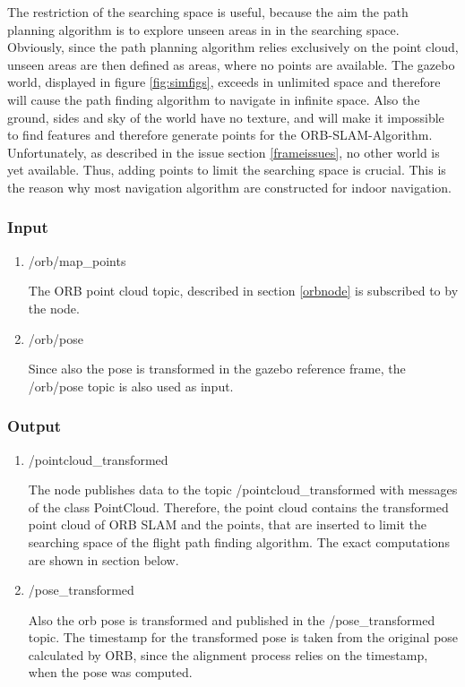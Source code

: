 	The restriction of the searching space is useful, because the aim the path planning algorithm is to explore unseen areas in in the searching space. Obviously, 
	since the path planning algorithm relies exclusively on the point cloud, unseen areas are then defined as areas, where no points are available. The gazebo world, 
	displayed in figure \ref{fig:simfigs}, exceeds in unlimited space and therefore will cause the path finding algorithm to navigate in infinite space. Also the ground, sides and 
	sky of the world have no texture, and will make it impossible to find features and therefore generate points for the ORB-SLAM-Algorithm. Unfortunately, 
	as described in the issue section \ref{frameissues}, no other world is yet available. Thus, adding points to 
	limit the searching space is crucial. This is the reason why most navigation algorithm are constructed for indoor navigation.
	
	\subsubsection{Input}
	
	\begin{enumerate}
	\item{/orb/map\_points}
	
	The ORB point cloud topic, described in section \ref{orbnode} is subscribed to by the node. 
	
	\item{/orb/pose}
	
	Since also the pose is transformed in the gazebo reference frame, the /orb/pose topic is also used as input. 
	
	\end{enumerate}
	
	\subsubsection{Output}
	
	\begin{enumerate}
	\item{/pointcloud\_transformed}
	
	The node publishes data to the topic /pointcloud\_transformed with messages of the class PointCloud. Therefore, the point cloud contains the transformed 
	point cloud of ORB SLAM and the points, that are inserted to limit the searching space of the flight path finding algorithm. 
	The exact computations are shown 
	in section below. 
	
	\item{/pose\_transformed}
	
	Also the orb pose is transformed and published in the /pose\_transformed topic. The timestamp for the transformed pose is taken from the original pose 
	calculated by ORB, since the alignment process relies on the timestamp, when the pose was computed. 
	
	\end{enumerate}
	
